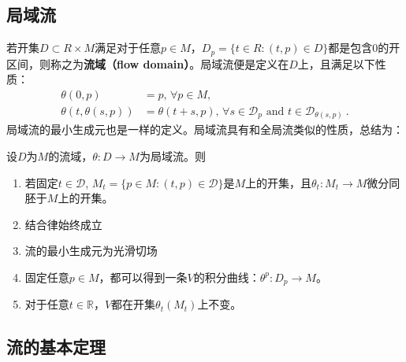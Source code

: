 \subsection{局域流}
若开集$D\subset R\times M$满足对于任意$p\in M$，$D_p=\{t\in R:(t,p)\in D\}$都是包含0的开区间，则称之为\textbf{流域（flow domain）}。局域流便是定义在$D$上，且满足以下性质：
\begin{equation}
\begin{aligned}
\theta(0, p) & =p ,\,\forall p \in M, \\
\theta(t, \theta(s, p)) & =\theta(t+s, p),\,\forall  s \in \mathcal{D}_{p} \text { and } t \in \mathcal{D}_{\theta(s, p)} ~.
\end{aligned}
\end{equation}
局域流的最小生成元也是一样的定义。局域流具有和全局流类似的性质，总结为：
\begin{lemma}{}
设$D$为$M$的流域，$\theta:D\rightarrow M$为局域流。则
\begin{enumerate}
\item 若固定$t\in \mathcal D$, $M_t=\{p \in M:(t, p) \in \mathcal{D}\}$是$M$上的开集，且$\theta_t: M_t\rightarrow M$微分同胚于$M$上的开集。
\item 结合律始终成立
\item 流的最小生成元为光滑切场
\item 固定任意$p\in M$，都可以得到一条$V$的积分曲线：$\theta^p: D_p\rightarrow M$。
\item 对于任意$t\in \mathbb R$，$V$都在开集$\theta_t(M_t)$上不变。
\end{enumerate}
\end{lemma}
\subsection{流的基本定理}
